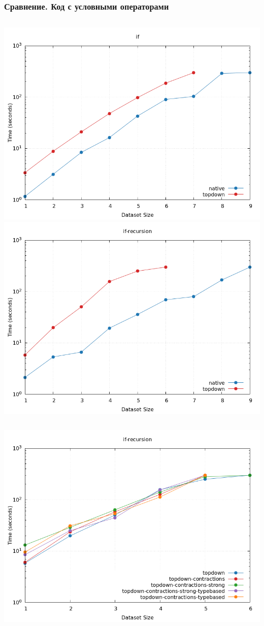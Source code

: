 \documentclass{beamer}
\begin{document}
\begin{frame}\frametitle{Сравнение. Код с условными операторами}
\begin{columns}
  \includegraphics[width=\textwidth]{basic_if.png}
  \includegraphics[width=\textwidth]{basic_ifrec.png}
\end{columns}
\begin{columns}
  \includegraphics[width=\textwidth]{topdown_ifrec.png}

\end{columns}
\end{frame}
\end{document}
